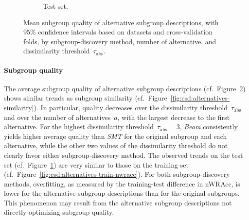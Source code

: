 \documentclass{article}
\theoremstyle{definition}
\begin{document}
\begin{figure}[t]
\begin{subfigure}[t]{0.48\textwidth}
		\caption{Test set.}
		\label{fig:csd:alternatives-test-nwracc}
	\end{subfigure}
	\caption{
		Mean subgroup quality of alternative subgroup descriptions, with 95\% confidence intervals based on datasets and cross-validation folds, by subgroup-discovery method, number of alternative, and dissimilarity threshold~$\tau_{\text{abs}}$.
	}
	\label{fig:csd:alternatives-nwracc}
\end{figure}

\paragraph{Subgroup quality}

The average subgroup quality of alternative subgroup descriptions (cf.~Figure~\ref{fig:csd:alternatives-nwracc}) shows similar trends as subgroup similarity (cf.~Figure~\ref{fig:csd:alternatives-similarity}).
In particular, quality decreases over the dissimilarity threshold~$\tau_{\text{abs}}$ and over the number of alternatives~$a$, with the largest decrease to the first alternative.
For the highest dissimilarity threshold~$\tau_{\text{abs}} = 3$, \emph{Beam} consistently yields higher average quality than \emph{SMT} for the original subgroup and each alternative, while the other two values of the dissimilarity threshold do not clearly favor either subgroup-discovery method.
The observed trends on the test set (cf.~Figure~\ref{fig:csd:alternatives-test-nwracc}) are very similar to those on the training set (cf.~Figure~\ref{fig:csd:alternatives-train-nwracc}).
For both subgroup-discovery methods, overfitting, as measured by the training-test difference in nWRAcc, is lower for the alternative subgroup descriptions than for the original subgroups.
This phenomenon may result from the alternative subgroup descriptions not directly optimizing subgroup quality.
\end{document}
